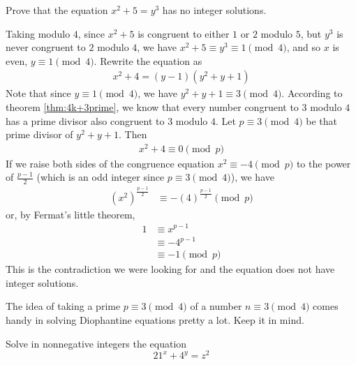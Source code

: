 		\begin{problem}
			Prove that the equation $x^2+5=y^3$ has no integer solutions.
		\end{problem}

		\begin{solution}
			Taking modulo $4$, since $x^2+5$ is congruent to either $1$ or $2$ modulo $5$, but $y^3$ is never congruent to $2$ modulo $4$, we have $x^2 + 5 \equiv y^3 \equiv 1 \pmod 4$, and so $x$ is even, $y \equiv 1 \pmod 4$. Rewrite the equation as
				\begin{align*}
					x^2+4 = (y-1)(y^2+y+1)
				\end{align*}
			Note that since $y \equiv 1 \pmod 4$, we have $y^2+y+1 \equiv 3 \pmod 4$. According to theorem \eqref{thm:4k+3prime}, we know that every number congruent to $3$ modulo $4$ has a prime divisor also congruent to $3$ modulo $4$. Let $p \equiv 3 \pmod 4$ be that prime divisor of $y^2+y+1$. Then
				\begin{align*}
					x^2 + 4 \equiv 0 \pmod p
				\end{align*}
			If we raise both sides of the congruence equation $x^2 \equiv -4 \pmod p$ to the power of $\frac{p-1}{2}$ (which is an odd integer since $p \equiv 3 \pmod 4$), we have
				\begin{align*}
					\left(x^2\right)^{\frac{p-1}{2}}
						& \equiv -\left(4\right)^{\frac{p-1}{2}} \pmod p
				\end{align*}
			or, by Fermat's little theorem,
				\begin{align*}
					1
						& \equiv x^{p-1}\\
						& \equiv -4^{p-1}\\
						& \equiv -1 \pmod p
				\end{align*}
			This is the contradiction we were looking for and the equation does not have integer solutions.
		\end{solution}

		\begin{note}
			The idea of taking a prime $p \equiv 3 \pmod 4$ of a number $n \equiv 3 \pmod 4$ comes handy in solving Diophantine equations pretty a lot. Keep it in mind.
		\end{note}

		\begin{problem}
			Solve in nonnegative integers the equation
			\[21^x+4^y=z^2\]
		\end{problem}

